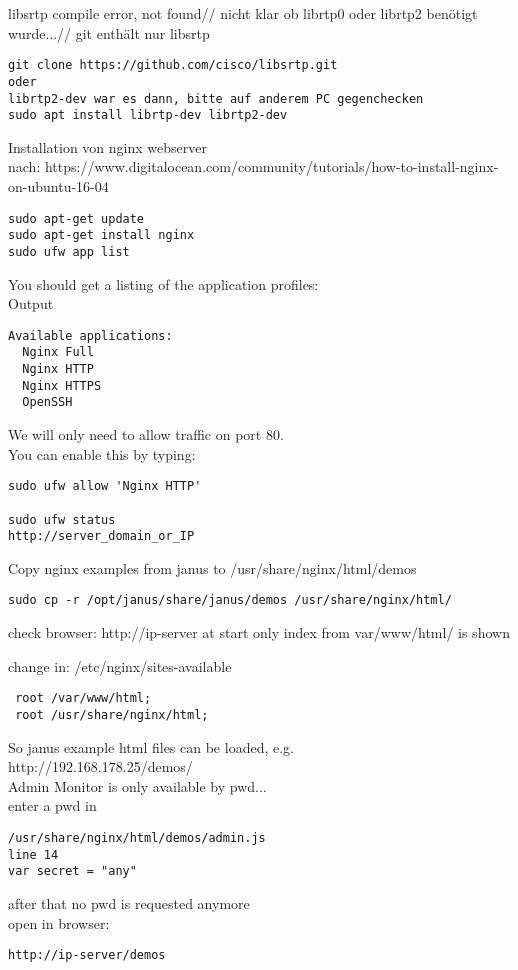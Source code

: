 libsrtp compile error, not found//
nicht klar ob librtp0 oder librtp2 benötigt wurde...//
git enthält nur libsrtp
\begin{verbatim}
git clone https://github.com/cisco/libsrtp.git
oder
librtp2-dev war es dann, bitte auf anderem PC gegenchecken
sudo apt install librtp-dev librtp2-dev
\end{verbatim}

Installation von nginx webserver\\
nach: https://www.digitalocean.com/community/tutorials/how-to-install-nginx-on-ubuntu-16-04
\begin{verbatim}
sudo apt-get update
sudo apt-get install nginx
sudo ufw app list
\end{verbatim}

You should get a listing of the application profiles:\\
Output
\begin{verbatim}
Available applications:
  Nginx Full
  Nginx HTTP
  Nginx HTTPS
  OpenSSH
\end{verbatim}

We will only need to allow traffic on port 80.\\
You can enable this by typing:
\begin{verbatim}
sudo ufw allow 'Nginx HTTP'

sudo ufw status
http://server_domain_or_IP
\end{verbatim}

Copy nginx examples from janus to /usr/share/nginx/html/demos
\begin{verbatim}
sudo cp -r /opt/janus/share/janus/demos /usr/share/nginx/html/
\end{verbatim}
check browser: http://ip-server
at start only index from var/www/html/ is shown

change in: /etc/nginx/sites-available
\begin{verbatim}
 root /var/www/html;
 root /usr/share/nginx/html;
\end{verbatim}
So janus example html files can be loaded, e.g.\\
http://192.168.178.25/demos/\\

Admin Monitor is only available by pwd...\\
enter a pwd in 
\begin{verbatim}
/usr/share/nginx/html/demos/admin.js
line 14
var secret = "any"
\end{verbatim}
after that no pwd is requested anymore\\
open in browser:
\begin{verbatim}
http://ip-server/demos
\end{verbatim}

